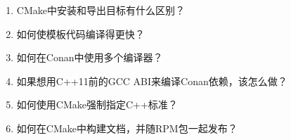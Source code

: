 \begin{enumerate}
\item
CMake中安装和导出目标有什么区别？

\item
如何使模板代码编译得更快？

\item
如何在Conan中使用多个编译器？

\item
如果想用C++11前的GCC ABI来编译Conan依赖，该怎么做？

\item
如何使用CMake强制指定C++标准？

\item
如何在CMake中构建文档，并随RPM包一起发布？
\end{enumerate}